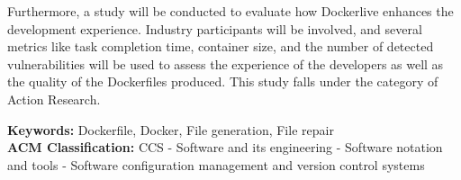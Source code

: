 \documentclass[11pt,a4paper]{article}
\newcommand{\titles}[2]{\noindent\textbf{#1:} #2\\[2mm]}
\begin{document}
Furthermore, a study will be conducted to evaluate how Dockerlive enhances the development experience. Industry participants will be involved, and several metrics like task completion time, container size, and the number of detected vulnerabilities will be used to assess the experience of the developers as well as the quality of the Dockerfiles produced. This study falls under the category of Action Research.

\titles{Keywords}{Dockerfile, Docker, File generation, File repair}
\titles{ACM Classification}{CCS - Software and its engineering - Software notation and tools - Software configuration management and version control systems
}



\nocite{*}  %



\end{document}
